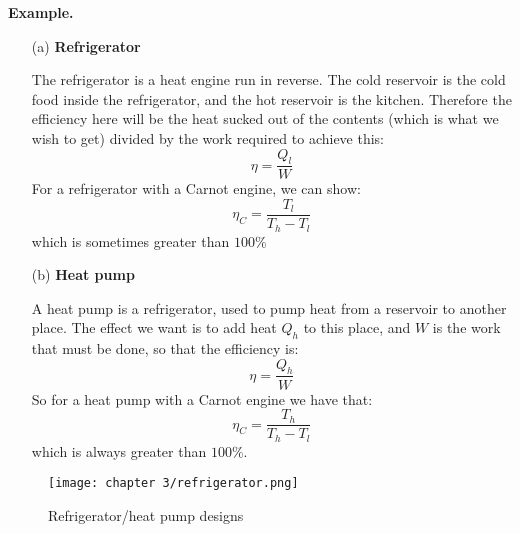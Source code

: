 \documentclass[a4paper,11pt,oneside]{book}
\begin{document}
\begin{mdframed}
\textbf{Example.} 
\begin{enumerate}
    \item[(a)] \textbf{Refrigerator}
    
    
    The refrigerator is a heat engine run in reverse. The cold reservoir is the cold food inside the refrigerator, and the hot reservoir is the kitchen. Therefore the efficiency here will be the heat sucked out of the contents (which is what we wish to get) divided by the work required to achieve this:
    \begin{equation}
        \eta = \frac{Q_l}{W}
    \end{equation}
    For a refrigerator with a Carnot engine, we can show:
    \begin{equation}
        \eta_C = \frac{T_l}{T_h-T_l}
    \end{equation}
    which is sometimes greater than $100\%$
    \item[(b)] \textbf{Heat pump}
    
    A heat pump is a refrigerator, used to pump heat from a reservoir to another place. The effect we want is to add heat $Q_h$ to this place, and $W$ is the work that must be done, so that the efficiency is:
    \begin{equation}
        \eta = \frac{Q_h}{W}
    \end{equation}
    So for a heat pump with a Carnot engine we have that:
    \begin{equation}
          \eta_C = \frac{T_h}{T_h-T_l}
    \end{equation}
    which is always greater than $100\%$. 
\end{enumerate}
\end{mdframed}
 \begin{figure}[t!]
  \centering
  \texttt{[image: chapter 3/refrigerator.png]}
\caption{Refrigerator/heat pump designs}
\label{fig:test}
\end{figure}
\end{document}
